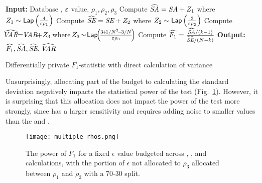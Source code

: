 \begin{algorithm}
    \begin{algorithmic}
        \STATE \textbf{Input:} Database \x, $\varepsilon$ value, $\rho_1, \rho_2, \rho_3$
        \STATE Compute $\widehat{\textit{SA}} = \textit{SA} + Z_1$ where $Z_1\sim {\sf Lap}\left(\frac{4}{\varepsilon \rho_1}\right)$
        \STATE Compute $\widehat{\textit{SE}} = \textit{SE}+ Z_2$ where $Z_2\sim {\sf Lap}\left(\frac{3}{\varepsilon \rho_2}\right)$
        \STATE Compute $\!\!\widehat{\var} \!\!= \!\!\var \!\!+\! Z_3\!$ where  $\!Z_3 \!\sim\! \lap\!\!\left(\! \frac{3\!+\!1/N^2\! - \!3/N}{\eps\rho_3} \!\right)$
        \STATE Compute $\widehat{F_1} = \frac{\widehat{\textit{SA}}/(k-1)}{\widehat{\textit{SE}}/(N-k)}$
        \STATE \textbf{Output:} $\widehat{F_1}, \widehat{\textit{SA}}, \widehat{\textit{SE}}, \widehat{\textit{VAR}}$
    \end{algorithmic}
    \caption{Differentially private $F_1$-statistic with direct calculation of variance}
     \label{alg:F1hatVar}
\end{algorithm}

Unsurprisingly, allocating part of the budget to calculating the standard deviation negatively impacts the statistical power of the test (Fig.~\ref{Fig:multiple-rhos}). However, it is surprising that this allocation does not impact the power of the test more strongly, since \var has a larger sensitivity and requires adding noise to smaller values than the \sa and \se. 


\begin{figure}[h]
\centering
\texttt{[image: multiple-rhos.png]}
\caption{The power of $F_1$ for a fixed $\epsilon$ value budgeted across \sa, \se, and \var calculations, with the portion of $\epsilon$ not allocated to $\rho_3$ allocated between $\rho_1$ and $\rho_2$ with a 70-30 split.\label{Fig:multiple-rhos}}
\end{figure}
